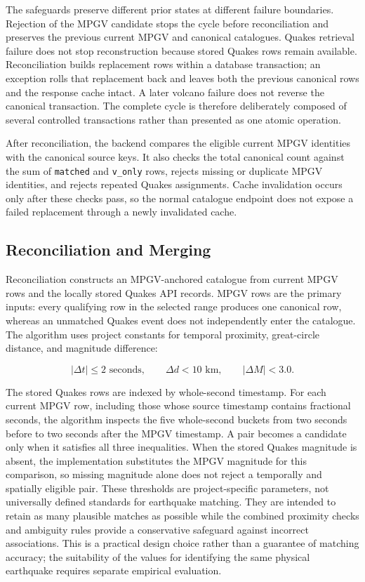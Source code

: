 \documentclass[12pt]{article}
\begin{document}
The safeguards preserve different prior states at different failure boundaries. Rejection of the MPGV candidate stops the cycle before reconciliation and preserves the previous current MPGV and canonical catalogues. Quakes retrieval failure does not stop reconstruction because stored Quakes rows remain available. Reconciliation builds replacement rows within a database transaction; an exception rolls that replacement back and leaves both the previous canonical rows and the response cache intact. A later volcano failure does not reverse the canonical transaction. The complete cycle is therefore deliberately composed of several controlled transactions rather than presented as one atomic operation.

After reconciliation, the backend compares the eligible current MPGV identities with the canonical source keys. It also checks the total canonical count against the sum of \texttt{matched} and \texttt{v\_only} rows, rejects missing or duplicate MPGV identities, and rejects repeated Quakes assignments. Cache invalidation occurs only after these checks pass, so the normal catalogue endpoint does not expose a failed replacement through a newly invalidated cache.

\subsection{Reconciliation and Merging}
\label{subsec:reconcile}

Reconciliation constructs an MPGV-anchored catalogue from current MPGV rows and the locally stored Quakes API records. MPGV rows are the primary inputs: every qualifying row in the selected range produces one canonical row, whereas an unmatched Quakes event does not independently enter the catalogue. The algorithm uses project constants for temporal proximity, great-circle distance, and magnitude difference:

\[
|\Delta t| \leq 2 \text{ seconds}, \qquad
\Delta d < 10 \text{ km}, \qquad
|\Delta M| < 3.0.
\]

The stored Quakes rows are indexed by whole-second timestamp. For each current MPGV row, including those whose source timestamp contains fractional seconds, the algorithm inspects the five whole-second buckets from two seconds before to two seconds after the MPGV timestamp. A pair becomes a candidate only when it satisfies all three inequalities. When the stored Quakes magnitude is absent, the implementation substitutes the MPGV magnitude for this comparison, so missing magnitude alone does not reject a temporally and spatially eligible pair. These thresholds are project-specific parameters, not universally defined standards for earthquake matching. They are intended to retain as many plausible matches as possible while the combined proximity checks and ambiguity rules provide a conservative safeguard against incorrect associations. This is a practical design choice rather than a guarantee of matching accuracy; the suitability of the values for identifying the same physical earthquake requires separate empirical evaluation.
\end{document}
